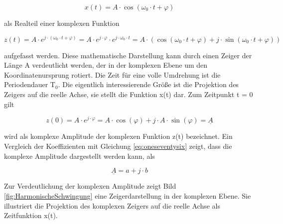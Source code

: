 \begin{equation}\label{eq:oneeightythree}
x\left(t\right)=A\cdot \cos \left(\omega _{0} \cdot t+\varphi \right)
\end{equation}


\noindent als Realteil einer komplexen Funktion

\begin{equation}\label{eq:oneeightyfour}
z\left(t\right)=A\cdot e^{j\cdot \left(\omega _{0} \cdot t+\varphi \right)} =A\cdot e^{j\cdot \varphi } \cdot e^{j\cdot \omega _{0} \cdot t} =A\cdot \left(\cos \left(\omega _{0} \cdot t+\varphi \right)+j\cdot \sin \left(\omega _{0} \cdot t+\varphi \right)\right)
\end{equation}


\noindent aufgefasst werden. Diese mathematische Darstellung kann durch einen Zeiger der L\"{a}nge A verdeutlicht werden, der in der komplexen Ebene um den Koordinatenursprung rotiert. Die Zeit f\"{u}r eine volle Umdrehung ist die Periodendauer T${}_{0}$. Die eigentlich interessierende Gr\"{o}{\ss}e ist die Projektion des Zeigers auf die reelle Achse, sie stellt die Funktion x(t) dar. Zum Zeitpunkt t = 0 gilt

\begin{equation}\label{eq:oneeightyfive}
z\left(0\right)=A\cdot e^{j\cdot \varphi } =A\cdot \cos \left(\varphi \right)+j\cdot A\cdot \sin \left(\varphi \right)=\underline{A}
\end{equation}

\noindent {} wird als komplexe Amplitude der komplexen Funktion z(t) bezeichnet. Ein Vergleich der Koeffizienten mit Gleichung \ref{eq:oneseventysix} zeigt, dass die komplexe Amplitude  dargestellt werden kann, als 

\begin{equation}\label{eq:oneeightysix}
\underline{A}=a+j\cdot b
\end{equation}


\noindent Zur Verdeutlichung der komplexen Amplitude  zeigt Bild \ref{fig:HarmonischeSchwingung} eine Zeigerdarstellung in der komplexen Ebene. Sie illustriert die Projektion des komplexen Zeigers auf die reelle Achse als Zeitfunktion x(t).

